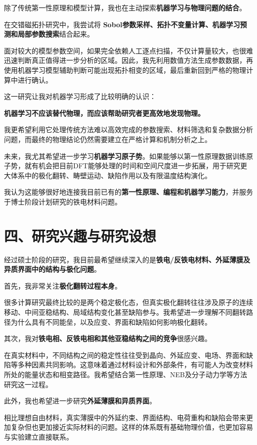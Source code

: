 除了传统第一性原理和模型计算，我也在主动探索\textbf{机器学习与物理问题的结合}。

在交错磁拓扑研究中，我尝试将 \textbf{Sobol参数采样、拓扑不变量计算、机器学习预测和局部参数搜索}结合起来。

面对较大的模型参数空间，如果完全依赖人工逐点扫描，不仅计算量较大，也很难迅速判断真正值得进一步分析的区域。因此，我先利用数值方法生成参数数据，再使用机器学习模型辅助判断可能出现拓扑相变的区域，最后重新回到严格的物理计算中进行确认。

这一研究让我对机器学习形成了比较明确的认识：

\textbf{机器学习不应该替代物理，而应该帮助研究者更高效地发现物理。}

我更希望利用它处理传统方法难以高效完成的参数搜索、材料筛选和复杂数据分析问题，而最终的物理结论仍然需要建立在严格计算和机制分析之上。

未来，我尤其希望进一步学习\textbf{机器学习原子势}。如果能够以第一性原理数据训练原子势，就有机会把目前DFT能够处理的时间和空间尺度进一步拓展，用于研究更大体系中的极化翻转、畴壁运动、缺陷作用以及有限温度结构演化。

我认为这能够很好地连接我目前已有的\textbf{第一性原理、编程和机器学习能力}，并服务于博士阶段计划研究的铁电材料问题。

\section{四、研究兴趣与研究设想}

经过硕士阶段的研究，我目前最希望继续深入的是\textbf{铁电/反铁电材料、外延薄膜及异质界面中的结构与极化问题}。

首先，我非常关注\textbf{极化翻转过程本身}。

很多计算研究最终比较的是两个稳定极化态，但真实极化翻转往往涉及原子的连续移动、中间亚稳结构、局域结构变化甚至缺陷参与。我希望进一步理解不同翻转路径为什么具有不同能垒，以及应变、界面和缺陷如何影响极化翻转。

其次，我对\textbf{铁电相、反铁电相和其他亚稳结构之间的竞争}很感兴趣。

在真实材料中，不同结构之间的稳定性往往受到晶向、外延应变、电场、界面和缺陷等多种因素共同影响。这意味着通过材料设计和外部条件，有可能人为改变材料所处的能量状态和相变路径。我希望结合第一性原理、NEB及分子动力学等方法研究这一过程。

此外，我也希望进一步研究\textbf{外延薄膜和异质界面}。

相比理想自由材料，真实薄膜中的外延约束、界面结构、电荷重构和缺陷会带来更加复杂但也更加接近实际材料的问题。这样的体系既有基础物理价值，也更加容易与实验建立直接联系。

